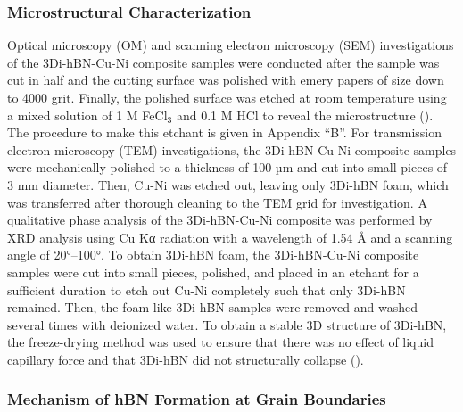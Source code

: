 \subsubsection{Microstructural Characterization}

Optical microscopy (OM) and scanning electron microscopy (SEM) investigations of the 3Di-hBN-Cu-Ni composite samples were conducted after the sample was cut in half and the cutting surface was polished with emery papers of size down to 4000 grit. Finally, the polished surface was etched at room temperature using a mixed solution of 1 M FeC$\text{l}_{3}$ and 0.1 M HCl to reveal the microstructure (\cite{kawk2019simple}). The procedure to make this etchant is given in Appendix “B”. For transmission electron microscopy (TEM) investigations, the 3Di-hBN-Cu-Ni composite samples were mechanically polished to a thickness of 100 µm and cut into small pieces of 3 mm diameter. Then, Cu-Ni was etched out, leaving only 3Di-hBN foam, which was transferred after thorough cleaning to the TEM grid for investigation. A qualitative phase analysis of the 3Di-hBN-Cu-Ni composite was performed by XRD analysis using Cu Kα radiation with a wavelength of 1.54 Å and a scanning angle of 20°–100°.  To obtain 3Di-hBN foam, the 3Di-hBN-Cu-Ni composite samples were cut into small pieces, polished, and placed in an etchant for a sufficient duration to etch out Cu-Ni completely such that only 3Di-hBN remained. Then, the foam-like 3Di-hBN samples were removed and washed several times with deionized water. To obtain a stable 3D structure of 3Di-hBN, the freeze-drying method was used to ensure that there was no effect of liquid capillary force and that 3Di-hBN did not structurally collapse (\cite{ding2017mechanical}). 

\subsubsection{Mechanism of hBN Formation at Grain Boundaries}

